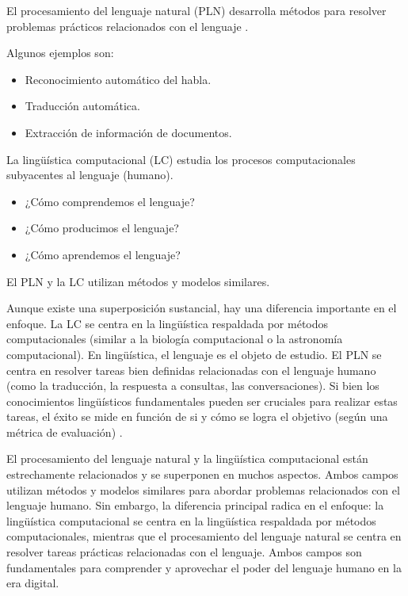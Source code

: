 El procesamiento del lenguaje natural (PLN) desarrolla métodos para resolver problemas prácticos relacionados con el lenguaje \cite{JohnsonMLSS}.

Algunos ejemplos son:

\begin{itemize}
  \item Reconocimiento automático del habla.
  \item Traducción automática.
  \item Extracción de información de documentos.
\end{itemize}

La lingüística computacional (LC) estudia los procesos computacionales subyacentes al lenguaje (humano).

\begin{itemize}
  \item ¿Cómo comprendemos el lenguaje?
  \item ¿Cómo producimos el lenguaje?
  \item ¿Cómo aprendemos el lenguaje?
\end{itemize}

El PLN y la LC utilizan métodos y modelos similares.


Aunque existe una superposición sustancial, hay una diferencia importante en el enfoque. La LC se centra en la lingüística respaldada por métodos computacionales (similar a la biología computacional o la astronomía computacional). En lingüística, el lenguaje es el objeto de estudio. El PLN se centra en resolver tareas bien definidas relacionadas con el lenguaje humano (como la traducción, la respuesta a consultas, las conversaciones). Si bien los conocimientos lingüísticos fundamentales pueden ser cruciales para realizar estas tareas, el éxito se mide en función de si y cómo se logra el objetivo (según una métrica de evaluación) \cite{jacobbook}.



El procesamiento del lenguaje natural y la lingüística computacional están estrechamente relacionados y se superponen en muchos aspectos. Ambos campos utilizan métodos y modelos similares para abordar problemas relacionados con el lenguaje humano. Sin embargo, la diferencia principal radica en el enfoque: la lingüística computacional se centra en la lingüística respaldada por métodos computacionales, mientras que el procesamiento del lenguaje natural se centra en resolver tareas prácticas relacionadas con el lenguaje. Ambos campos son fundamentales para comprender y aprovechar el poder del lenguaje humano en la era digital.


